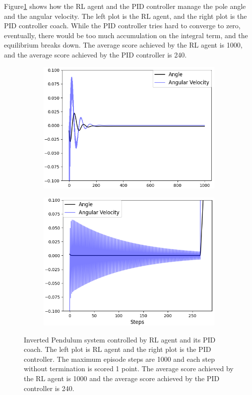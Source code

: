 \documentclass[journal]{IEEEtran}
\begin{document}
Figure\ref{fig:ip} shows how the RL agent and the PID controller manage the pole angle and the angular velocity. The left plot is the RL agent, and the right plot is the PID controller coach. While the PID controller tries hard to converge to zero, eventually, there would be too much accumulation on the integral term, and the equilibrium breaks down. The average score achieved by the RL agent is 1000, and the average score achieved by the PID controller is 240.
\begin{figure}
\centering
\begin{subfigure}{0.24\textwidth}
  \centering
  \includegraphics[width=\linewidth]{ip_RL.png}
\end{subfigure}
\hfill
\begin{subfigure}{.24\textwidth}
  \centering
  \includegraphics[width=\linewidth]{ip_PID.png}
\end{subfigure}
\caption{Inverted Pendulum system controlled by RL agent and its PID coach. The left plot is RL agent and the right plot is the PID controller. The maximum episode steps are 1000 and each step without termination is scored 1 point. The average score achieved by the RL agent is 1000 and the average score achieved by the PID controller is 240.}
\label{fig:ip}
\end{figure}
\end{document}
